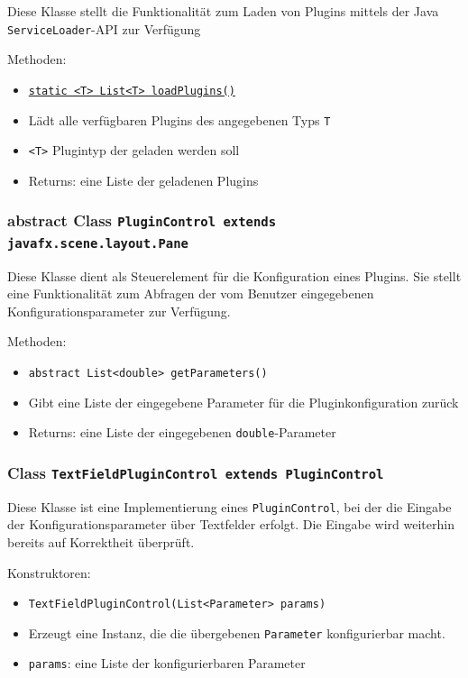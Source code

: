 \documentclass[parskip=full,11pt]{scrartcl}
\begin{document}
Diese Klasse stellt die Funktionalität zum Laden von Plugins mittels der Java \texttt{ServiceLoader}-API zur Verfügung

Methoden:

\begin{itemize}\itemsep -10pt
	\item \underline{\texttt{static <T> List<T> loadPlugins()}}
	\item[] Lädt alle verfügbaren Plugins des angegebenen Typs \texttt{T}
	\item[] \texttt{<T>} Plugintyp der geladen werden soll
	\item[]Returns: eine Liste der geladenen Plugins
\end{itemize}

\subsubsection{abstract Class \texttt{PluginControl extends javafx.scene.layout.Pane}}

Diese Klasse dient als Steuerelement für die Konfiguration eines Plugins. Sie stellt eine Funktionalität zum Abfragen der vom Benutzer eingegebenen Konfigurationsparameter zur Verfügung.

Methoden:

\begin{itemize}\itemsep -10pt
	\item \texttt{abstract List<double> getParameters()}
	\item[] Gibt eine Liste der eingegebene Parameter für die Pluginkonfiguration zurück
	\item[] Returns: eine Liste der eingegebenen \texttt{double}-Parameter
\end{itemize}

\subsubsection{Class \texttt{TextFieldPluginControl extends PluginControl}}

Diese Klasse ist eine Implementierung eines  \texttt{PluginControl}, bei der die Eingabe der Konfigurationsparameter über Textfelder erfolgt. Die Eingabe wird weiterhin bereits auf Korrektheit überprüft.

Konstruktoren:

\begin{itemize}\itemsep -10pt
	\item \texttt{TextFieldPluginControl(List<Parameter> params)}
	\item[] Erzeugt eine Instanz, die die übergebenen \texttt{Parameter} konfigurierbar macht.
	\item[] \texttt{params}: eine Liste der konfigurierbaren Parameter
\end{itemize}
\end{document}
